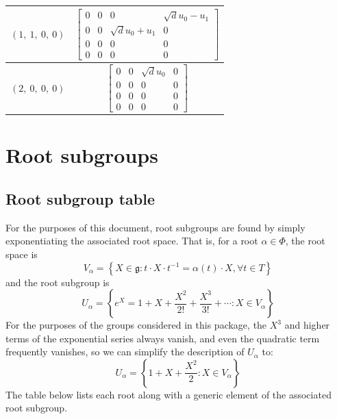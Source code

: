 \documentclass[11pt]{article}
\newcommand{\noi}{\noindent}
\newcommand{\inv}{^{-1}}
\newcommand{\lb}{\left\{}
\newcommand{\rb}{\right\}}
\newcommand{\frakg}{\mathfrak{g}}
\theoremstyle{definition}
\begin{document}
\begin{longtable}{|l|c|}
    \hline
    $\left( 1, \  1, \  0, \  0\right)$ & ${\left[\begin{matrix}0 & 0 & 0 & \sqrt{d} u_{0} - u_{1}\\0 & 0 & \sqrt{d} u_{0} + u_{1} & 0\\0 & 0 & 0 & 0\\0 & 0 & 0 & 0\end{matrix}\right]}$ \\
    \hline
    $\left( 2, \  0, \  0, \  0\right)$ & ${\left[\begin{matrix}0 & 0 & \sqrt{d} u_{0} & 0\\0 & 0 & 0 & 0\\0 & 0 & 0 & 0\\0 & 0 & 0 & 0\end{matrix}\right]}$ \\
    \hline
\end{longtable}


\newpage
\section{Root subgroups}

\subsection{Root subgroup table}

\noi For the purposes of this document, root subgroups are found by simply exponentiating the associated root space. That is, for a root $\alpha \in \Phi$, the root space is
\[
	V_\alpha = \lb X \in \frakg : t \cdot X \cdot t \inv = \alpha(t) \cdot X, \forall t \in T \rb
\]
and the root subgroup is
\[
	U_\alpha = \lb e^X = 1 + X + \frac{X^2}{2!} + \frac{X^3}{3!} + \cdots : X \in V_\alpha \rb
\]
For the purposes of the groups considered in this package, the $X^3$ and higher terms of the exponential series always vanish, and even the quadratic term frequently vanishes, so we can simplify the description of $U_\alpha$ to:
\[
	U_\alpha = \lb 1 + X + \frac{X^2}{2} : X \in V_\alpha \rb
\]
The table below lists each root along with a generic element of the associated root subgroup.
\end{document}
